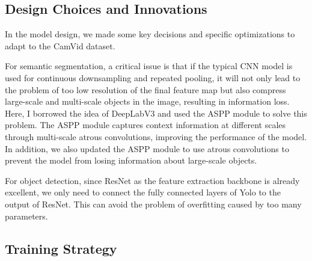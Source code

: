 \documentclass[conference]{IEEEtran}
\begin{document}
\subsection{Design Choices and Innovations}



In the model design, we made some key decisions and specific optimizations to adapt to the CamVid dataset.

For semantic segmentation, a critical issue is that if the typical CNN model is used for continuous downsampling and repeated pooling, it will not only lead to the problem of too low resolution of the final feature map but also compress large-scale and multi-scale objects in the image, resulting in information loss. Here, I borrowed the idea of DeepLabV3 and used the ASPP module to solve this problem. The ASPP module captures context information at different scales through multi-scale atrous convolutions, improving the performance of the model. In addition, we also updated the ASPP module to use atrous convolutions to prevent the model from losing information about large-scale objects.

For object detection, since ResNet as the feature extraction backbone is already excellent, we only need to connect the fully connected layers of Yolo to the output of ResNet. This can avoid the problem of overfitting caused by too many parameters.


\subsection{Training Strategy}
\end{document}

